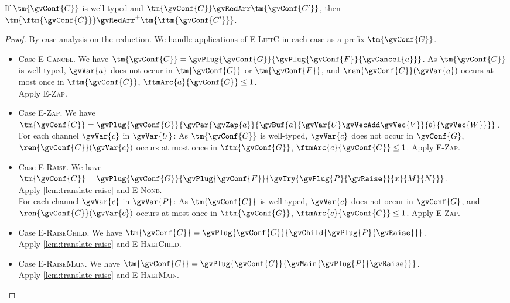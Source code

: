\begin{theorem}
  If $\tm{\gvConf{C}}$ is well-typed and $\tm{\gvConf{C}}\gvRedArr\tm{\gvConf{C'}}$,
  then \\ $\tm{\ftm{\gvConf{C}}}\gvRedArr^{+}\tm{\ftm{\gvConf{C'}}}$.
\end{theorem}
\begin{proof}
  By case analysis on the reduction.
  We handle applications of \textsc{E-LiftC} in each case as a prefix $\tm{\gvConf{G}}$.
  \begin{itemize}
  \item
    Case \textsc{E-Cancel}.
    We have $\tm{\gvConf{C}} = \gvPlug{\gvConf{G}}{\gvPlug{\gvConf{F}}{\gvCancel{a}}}$. As $\tm{\gvConf{C}}$ is well-typed, $\gvVar{a}$ does not occur in $\tm{\gvConf{G}}$ or $\tm{\gvConf{F}}$, and $\ren{\gvConf{C}}(\gvVar{a})$ occurs at most once in $\ftm{\gvConf{C}}$, \ie $\ftmArc{a}{\gvConf{C}}\le{1}$. \\
    Apply \textsc{E-Zap}.
  \item
    Case \textsc{E-Zap}.
    We have $\tm{\gvConf{C}} = \gvPlug{\gvConf{G}}{\gvPar{\gvZap{a}}{\gvBuf{a}{\gvVar{U}\gvVecAdd\gvVec{V}}{b}{\gvVec{W}}}}$. For each channel $\gvVar{c}$ in $\gvVar{U}$: As $\tm{\gvConf{C}}$ is well-typed, $\gvVar{c}$ does not occur in $\gvConf{G}$, $\ren{\gvConf{C}}(\gvVar{c})$ occurs at most once in $\ftm{\gvConf{G}}$, \ie $\ftmArc{c}{\gvConf{C}}\le{1}$. Apply \textsc{E-Zap}.
  \item
    Case \textsc{E-Raise}.
    We have \\
    $\tm{\gvConf{C}} = \gvPlug{\gvConf{G}}{\gvPlug{\gvConf{F}}{\gvTry{\gvPlug{P}{\gvRaise}}{x}{M}{N}}}$. \\
    Apply \cref{lem:translate-raise} and \textsc{E-None}. \\
    For each channel $\gvVar{c}$ in $\gvVar{P}$: As $\tm{\gvConf{C}}$ is well-typed, $\gvVar{c}$ does not occur in $\gvConf{G}$, and $\ren{\gvConf{C}}(\gvVar{c})$ occurs at most once in $\ftm{\gvConf{G}}$, \ie $\ftmArc{c}{\gvConf{C}}\le{1}$. Apply \textsc{E-Zap}.
  \item
    Case \textsc{E-RaiseChild}.
    We have
    $\tm{\gvConf{C}} = \gvPlug{\gvConf{G}}{\gvChild{\gvPlug{P}{\gvRaise}}}$. \\
    Apply \cref{lem:translate-raise} and \textsc{E-HaltChild}.
  \item
    Case \textsc{E-RaiseMain}.
    We have
    $\tm{\gvConf{C}} = \gvPlug{\gvConf{G}}{\gvMain{\gvPlug{P}{\gvRaise}}}$. \\
    Apply \cref{lem:translate-raise} and \textsc{E-HaltMain}.

\end{itemize}
\end{proof}
